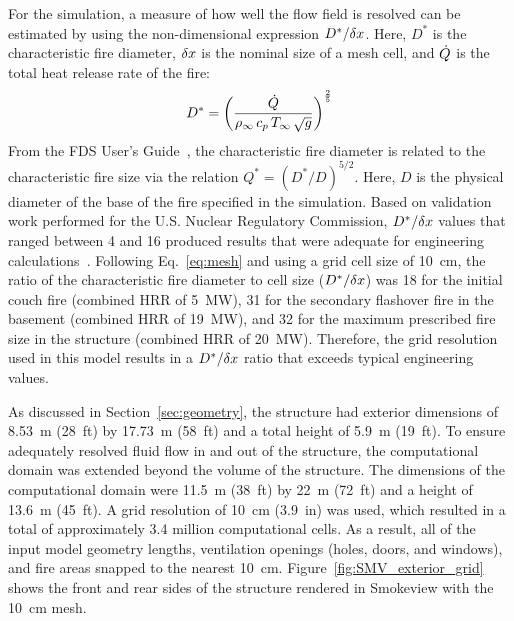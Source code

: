\documentclass[12pt,oneside]{book}
\begin{document}
For the simulation, a measure of how well the flow field is resolved can be estimated by using the non-dimensional expression $D^*/\delta x$. Here, $D^*$ is the characteristic fire diameter, $\delta x$ is the nominal size of a mesh cell, and $\dot{Q}$ is the total heat release rate of the fire:
\begin{equation}
D^* = \left(
     \frac{\dot{Q}}{\rho_\infty \, c_p \, T_\infty \, \sqrt{g}}
     \right)^\frac{2}{5} 
\label{eq:mesh}
\end{equation}
From the FDS User's Guide~\cite{FDS_Users_Guide}, the characteristic fire diameter is related to the characteristic fire size via the relation $Q^* = (D^*/D)^{5/2}$. Here, $D$ is the physical diameter of the base of the fire specified in the simulation. Based on validation work performed for the U.S. Nuclear Regulatory Commission, $D^*/\delta x$ values that ranged between 4 and 16 produced results that were adequate for engineering calculations~\cite{NUREG_1824}. Following Eq.~\ref{eq:mesh} and using a grid cell size of 10~cm, the ratio of the characteristic fire diameter to cell size ($D^*/\delta x$) was 18 for the initial couch fire (combined HRR of 5~MW), 31 for the secondary flashover fire in the basement (combined HRR of 19~MW), and 32 for the maximum prescribed fire size in the structure (combined HRR of 20~MW). Therefore, the grid resolution used in this model results in a $D^*/\delta x$ ratio that exceeds typical engineering values.

As discussed in Section~\ref{sec:geometry}, the structure had exterior dimensions of 8.53~m (28~ft) by 17.73~m (58~ft) and a total height of 5.9~m (19~ft). To ensure adequately resolved fluid flow in and out of the structure, the computational domain was extended beyond the volume of the structure. The dimensions of the computational domain were 11.5~m (38~ft) by 22~m (72~ft) and a height of 13.6~m (45~ft). A grid resolution of 10~cm (3.9~in) was used, which resulted in a total of approximately 3.4 million computational cells. As a result, all of the input model geometry lengths, ventilation openings (holes, doors, and windows), and fire areas snapped to the nearest 10~cm. Figure~\ref{fig:SMV_exterior_grid} shows the front and rear sides of the structure rendered in Smokeview with the 10~cm mesh.
\end{document}
